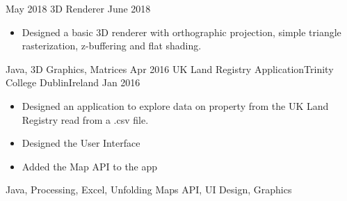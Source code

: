 
\begin{experiences}
\experience
    {May 2018} {3D Renderer}{}{}
    {June 2018}    {
                      \begin{itemize}
                        \item Designed a basic 3D renderer with orthographic projection, simple triangle rasterization, z-buffering and flat shading.              
                      \end{itemize}
                    }
                    {Java, 3D Graphics, Matrices}
  \emptySeparator 
  \experience
    {Apr 2016}   {{UK Land Registry Application}}{Trinity College Dublin}{Ireland}
    {Jan 2016} {
                      \begin{itemize}
                        \item Designed an application to explore data on property from the UK Land Registry read from a .csv file.
 \item Designed the User Interface 
 \item Added the Map API to the app 
                      \end{itemize}
                    }
                    {Java, Processing, Excel, Unfolding Maps API, UI Design, Graphics}
\end{experiences}
